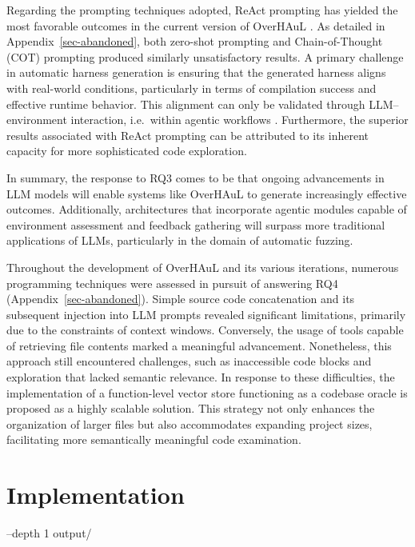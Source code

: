 \documentclass[
  a4paper,
  DIV=11,
  numbers=noendperiod]{scrreprt}
\theoremstyle{definition}
\theoremstyle{remark}
\begin{document}
Regarding the prompting techniques adopted, ReAct prompting has yielded
the most favorable outcomes in the current version of OverHAuL
\autocite{reAct}. As detailed in Appendix~\ref{sec-abandoned}, both
zero-shot prompting and Chain-of-Thought (COT) prompting
\autocite{chainofthought} produced similarly unsatisfactory results. A
primary challenge in automatic harness generation is ensuring that the
generated harness aligns with real-world conditions, particularly in
terms of compilation success and effective runtime behavior. This
alignment can only be validated through LLM--environment interaction,
i.e.~within agentic workflows \autocite{giannone2025}. Furthermore, the
superior results associated with ReAct prompting can be attributed to
its inherent capacity for more sophisticated code exploration.

In summary, the response to RQ3 comes to be that ongoing advancements in
LLM models will enable systems like OverHAuL to generate increasingly
effective outcomes. Additionally, architectures that incorporate agentic
modules capable of environment assessment and feedback gathering will
surpass more traditional applications of LLMs, particularly in the
domain of automatic fuzzing.

Throughout the development of OverHAuL and its various iterations,
numerous programming techniques were assessed in pursuit of answering
RQ4 (Appendix~\ref{sec-abandoned}). Simple source code concatenation and
its subsequent injection into LLM prompts revealed significant
limitations, primarily due to the constraints of context windows.
Conversely, the usage of tools capable of retrieving file contents
marked a meaningful advancement. Nonetheless, this approach still
encountered challenges, such as inaccessible code blocks and exploration
that lacked semantic relevance. In response to these difficulties, the
implementation of a function-level vector store functioning as a
codebase oracle is proposed as a highly scalable solution. This strategy
not only enhances the organization of larger files but also accommodates
expanding project sizes, facilitating more semantically meaningful code
examination.


\chapter{Implementation}\label{sec-implementation}

--depth 1 output/
\end{document}
